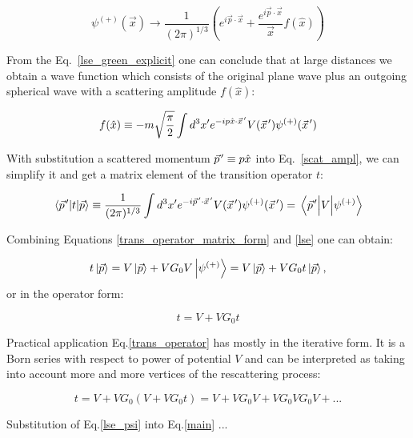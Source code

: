     \begin{equation}
        \psi^{(+)}(\vec{x}) \rightarrow \frac{1}{(2\pi)^{1/3}}
        \left( e^{i\vec{p} \cdot \vec{x}} + \frac{e^{i\vec{p} \cdot \vec{x}}}{\vec{x}} f(\hat{x}) \right)
        \label{lse_green_explicit}
    \end{equation}

    From the Eq.~\ref*{lse_green_explicit} one can conclude that at large distances
    we obtain a wave function which consists of the original plane wave plus
    an outgoing spherical wave with a scattering amplitude $f(\hat{x})$:

    \begin{equation}
        f(\hat{x}) \equiv -m \sqrt{\frac{\pi}{2}} \int d^3 x^\prime e^{-ip\hat{x}\cdot\pvec{x}}
        V(\pvec{x})\psi^{(+)}(\pvec{x})
        \label{scat_ampl}
    \end{equation}

    With substitution a scattered momentum $\pvec{p} \equiv p\hat{x}$ into Eq.~\ref{scat_ampl},
    we can simplify it and get a matrix element of the transition operator $t$:

    \begin{equation}
        \mel{\pvec{p}}{t}{\vec{p}} \equiv \frac{1}{(2\pi)^{1/3}} \int d^3 x^\prime e^{-i\pvec{p}\cdot\pvec{x}}
        V(\pvec{x})\psi^{(+)}(\pvec{x}) = \mel{\pvec{p}}{V}{\psi^{(+)}}
        \label{trans_operator_matrix_form}
    \end{equation}

    Combining Equations \ref*{trans_operator_matrix_form} and \ref*{lse} one can obtain:

    \begin{equation}
        t \ket{\vec{p}} = V \ket{\vec{p}} + V G_0 V \ket{\psi^{(+)}}
        =  V \ket{\vec{p}} + V G_0 t \ket{\vec{p}},
        \label{lse_psi} 
    \end{equation}
    or in the operator form:

    \begin{equation}
        t  =  V  + V G_0 t 
        \label{trans_operator}
    \end{equation}

    Practical application Eq.\ref*{trans_operator} has mostly in the iterative form.
    It is a Born series with respect to power of potential $V$ and can be interpreted
    as taking into account more and more vertices of the rescattering process:
    
    \begin{equation}
        t  =  V  + V G_0 (V  + V G_0 t) = V  + V G_0 V  + V G_0 V G_0 V  + ... 
        \label{trans_operator_iterative}
    \end{equation}
    
    Substitution of Eq.\ref*{lse_psi} into  Eq.\ref{main} ...
